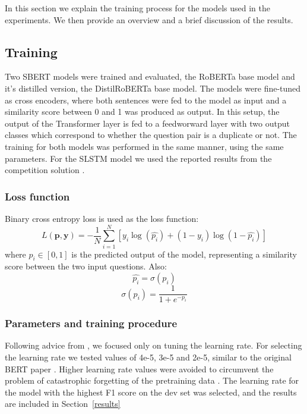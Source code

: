 \documentclass[10pt, a4paper]{article}
\begin{document}
In this section we explain the training process for the models used in the experiments.
We then provide an overview and a brief discussion of the results.

\subsection{Training} \label{training}

Two SBERT models were trained and evaluated, the RoBERTa base model and it's distilled version, the DistilRoBERTa base model.
The models were fine-tuned as cross encoders, where both sentences were fed to the model as input and a similarity score between 0 and 1 was produced as output.
In this setup, the output of the Transformer layer is fed to a feedworward layer with two output classes which correspond to whether the question pair is a duplicate or not.
The training for both models was performed in the same manner, using the same parameters.
For the SLSTM model we used the reported results from the competition solution \citep{dadashov2017quora}.

\subsubsection{Loss function}

Binary cross entropy loss is used as the loss function:
$$
L(\mathbf{p}, \mathbf{y}) = -\frac{1}{N} \sum_{i=1}^{N} \left[ y_i \log \left( \hat{p_i} \right) + (1 - y_i) \log \left( 1 - \hat{p_i} \right) \right]
$$
where $p_i \in [0, 1]$ is the predicted output of the model, representing a similarity score between the two input questions. Also:
$$
\hat{p_i} = \sigma(p_i)
$$
$$
\sigma(p_i) = \frac{1}{1 + e^{-p_i}}
$$

\subsubsection{Parameters and training procedure}

Following advice from \citet{gkouti2024should}, we focused only on tuning the learning rate. For selecting the learning rate we tested values of 4e-5, 3e-5 and 2e-5, similar to the original BERT paper \cite{devlin2018bert}.
Higher learning rate values were avoided to circumvent the problem of catastrophic forgetting of the pretraining data \citep{sun2019fine}.
The learning rate for the model with the highest F1 score on the dev set was selected, and the results are included in Section~\ref{results}
\end{document}

